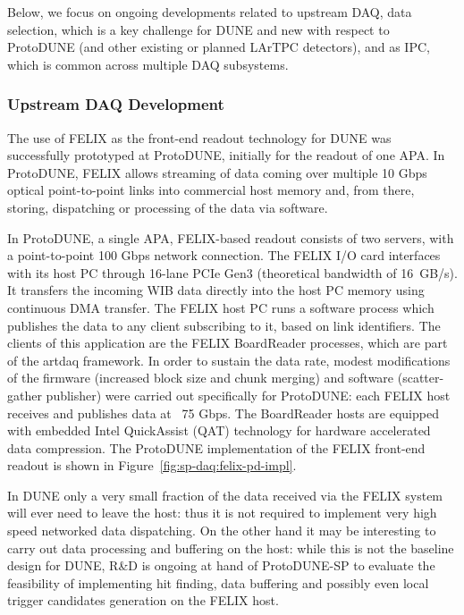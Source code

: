 Below, we focus on ongoing developments related to upstream DAQ,
data selection, which is a key challenge for DUNE and new with respect
to ProtoDUNE (and other existing or planned LArTPC detectors),
and as IPC, which is common across multiple DAQ subsystems.


\subsubsection{Upstream DAQ Development}

The use of FELIX as the front-end readout technology for DUNE was
successfully prototyped at ProtoDUNE, initially for the readout of one
APA. In ProtoDUNE, FELIX allows streaming of data coming over multiple 10
Gbps optical point-to-point links into commercial host memory and,
from there, storing, dispatching or processing of the data via
software. 

In ProtoDUNE, a single APA,  FELIX-based readout consists of two servers,
with a point-to-point 100 Gbps network connection.
The FELIX I/O card
interfaces with its host PC through 16-lane PCIe Gen3 (theoretical bandwidth of \SI{16}{GB/s}).
It transfers
the incoming WIB data directly into the host PC memory using
continuous DMA transfer. The FELIX host PC runs a software process
which publishes the data to any client subscribing to it, based on
link identifiers. The clients of this application are the FELIX
BoardReader processes, which are part of the artdaq framework. In
order to sustain the data rate, modest modifications of the firmware
(increased block size and chunk merging) and software (scatter-gather
publisher) were carried out specifically for ProtoDUNE: each FELIX
host receives and publishes data at ~75 Gbps. The BoardReader hosts
are equipped with embedded Intel QuickAssist (QAT) \cite{qat} technology for
hardware accelerated data compression. The ProtoDUNE implementation of
the FELIX front-end readout is
shown in Figure~\ref{fig:sp-daq:felix-pd-impl}.

In DUNE only a very small fraction of the data received via the FELIX
system will ever need to leave the host: thus it is not required to
implement very high speed networked data dispatching. On the other
hand it may be interesting to carry out data processing and buffering
on the host: while this is not the baseline design for DUNE, R\&D is
ongoing at hand of ProtoDUNE-SP to evaluate the feasibility of
implementing hit finding, data buffering and possibly even local
trigger candidates generation on the FELIX host. 

